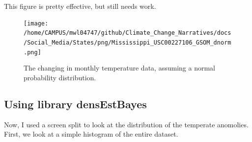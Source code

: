 \documentclass{article}
\begin{document}
This figure is pretty effective, but still needs work. 

\begin{figure}
\texttt{[image: /home/CAMPUS/mwl04747/github/Climate\_Change\_Narratives/docs/Social\_Media/States/png/Mississippi\_USC00227106\_GSOM\_dnorm.png]}
\caption{The changing in monthly temperature data, assuming a normal probability distribution.}
\label{fig:GSOM_dnorm}
\end{figure}

\subsection{Using library densEstBayes}

Now, I used a screen split to look at the distribution of the temperate anomolies. First, we look at a simple histogram of the entire dataset. 

\begin{knitrout}
\color{fgcolor}\begin{kframe}


{\ttfamily\noindent\bfseries{}}\end{kframe}
\end{knitrout}
\end{document}
